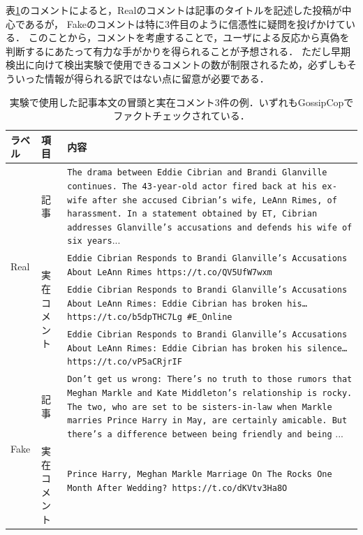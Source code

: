 表\ref{tbl:data_example}のコメントによると，Realのコメントは記事のタイトルを記述した投稿が中心であるが，
Fakeのコメントは特に3件目のように信憑性に疑問を投げかけている．
このことから，コメントを考慮することで，ユーザによる反応から真偽を判断するにあたって有力な手がかりを得られることが予想される．
ただし早期検出に向けて検出実験で使用できるコメントの数が制限されるため，必ずしもそういった情報が得られる訳ではない点に留意が必要である．
\begin{landscape}
\begin{table}[h]
    \centering
    \caption{実験で使用した記事本文の冒頭と実在コメント3件の例．いずれもGossipCopでファクトチェックされている．}
    \label{tbl:data_example}
    \begin{tabularx}{\linewidth}{llX}  \hline
        ラベル & 項目 & 内容 \\ \hline
        \multirow{4}{*}{Real} & 記事                         & \texttt{The drama between Eddie Cibrian and Brandi Glanville continues.  The 43-year-old actor fired back at his ex-wife after she accused Cibrian's wife, LeAnn Rimes, of harassment.  In a statement obtained by ET, Cibrian addresses Glanville's accusations and defends his wife of six years}...\\ \cline{2-3}
                              & \multirow{3}{*}{実在コメント} & \texttt{Eddie Cibrian Responds to Brandi Glanville’s Accusations About LeAnn Rimes https://t.co/QV5UfW7wxm}\\ \cline{3-3}
                              &                             & \texttt{Eddie Cibrian Responds to Brandi Glanville's Accusations About LeAnn Rimes: Eddie Cibrian has broken his… https://t.co/b5dpTHC7Lg \#E\_Online}\\ \cline{3-3}
                              &                             & \texttt{Eddie Cibrian Responds to Brandi Glanville's Accusations About LeAnn Rimes: Eddie Cibrian has broken his silence… https://t.co/vP5aCRjrIF}\\ \hline
        \multirow{4}{*}{Fake} & 記事                         & \texttt{Don’t get us wrong: There’s no truth to those rumors that Meghan Markle and Kate Middleton's relationship is rocky. The two, who are set to be sisters-in-law when Markle marries Prince Harry in May, are certainly amicable. But there’s a difference between being friendly and being} ...\\ \cline{2-3}
                              & \multirow{3}{*}{実在コメント} & \texttt{Prince Harry, Meghan Markle Marriage On The Rocks One Month After Wedding? https://t.co/dKVtv3Ha8O}\\ \cline{3-3}

\end{tabularx}
\end{table}
\end{landscape}
